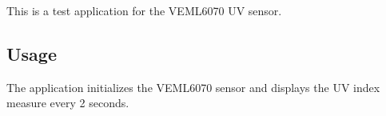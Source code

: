 This is a test application for the V\+E\+M\+L6070 UV sensor.

\subsection*{Usage}

The application initializes the V\+E\+M\+L6070 sensor and displays the UV index measure every 2 seconds. 